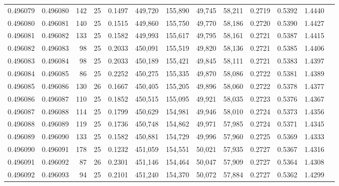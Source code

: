 \begin{tabular}{rrrrrrrrrrrrr}
0.496079 & 0.496080 &   142 &  25 &                                     0.1497 & 449,720 & 155,890 &  49,745 &  58,211 & 0.2719 & 0.5392 & 1.4440 \\
0.496080 & 0.496081 &   140 &  25 &                                     0.1515 & 449,860 & 155,750 &  49,770 &  58,186 & 0.2720 & 0.5390 & 1.4427 \\
0.496081 & 0.496082 &   133 &  25 &                                     0.1582 & 449,993 & 155,617 &  49,795 &  58,161 & 0.2721 & 0.5387 & 1.4415 \\
0.496082 & 0.496083 &    98 &  25 &                                     0.2033 & 450,091 & 155,519 &  49,820 &  58,136 & 0.2721 & 0.5385 & 1.4406 \\
0.496083 & 0.496084 &    98 &  25 &                                     0.2033 & 450,189 & 155,421 &  49,845 &  58,111 & 0.2721 & 0.5383 & 1.4397 \\
0.496084 & 0.496085 &    86 &  25 &                                     0.2252 & 450,275 & 155,335 &  49,870 &  58,086 & 0.2722 & 0.5381 & 1.4389 \\
0.496085 & 0.496086 &   130 &  26 &                                     0.1667 & 450,405 & 155,205 &  49,896 &  58,060 & 0.2722 & 0.5378 & 1.4377 \\
0.496086 & 0.496087 &   110 &  25 &                                     0.1852 & 450,515 & 155,095 &  49,921 &  58,035 & 0.2723 & 0.5376 & 1.4367 \\
0.496087 & 0.496088 &   114 &  25 &                                     0.1799 & 450,629 & 154,981 &  49,946 &  58,010 & 0.2724 & 0.5373 & 1.4356 \\
0.496088 & 0.496089 &   119 &  25 &                                     0.1736 & 450,748 & 154,862 &  49,971 &  57,985 & 0.2724 & 0.5371 & 1.4345 \\
0.496089 & 0.496090 &   133 &  25 &                                     0.1582 & 450,881 & 154,729 &  49,996 &  57,960 & 0.2725 & 0.5369 & 1.4333 \\
0.496090 & 0.496091 &   178 &  25 &                                     0.1232 & 451,059 & 154,551 &  50,021 &  57,935 & 0.2727 & 0.5367 & 1.4316 \\
0.496091 & 0.496092 &    87 &  26 &                                     0.2301 & 451,146 & 154,464 &  50,047 &  57,909 & 0.2727 & 0.5364 & 1.4308 \\
0.496092 & 0.496093 &    94 &  25 &                                     0.2101 & 451,240 & 154,370 &  50,072 &  57,884 & 0.2727 & 0.5362 & 1.4299 \\

\end{tabular}
